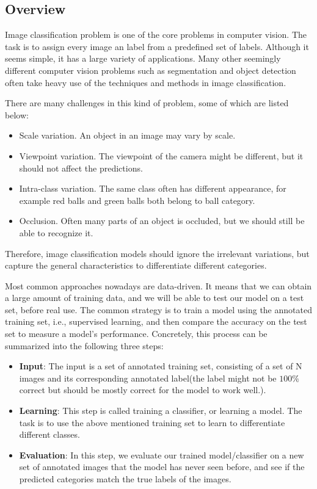 \subsection{Overview}
Image classification problem is one of the core problems in computer vision. The task is to assign every image an label from a predefined set of labels. Although it seems simple, it has a large variety of applications. Many other seemingly different computer vision problems such as segmentation and object detection often take heavy use of the techniques and methods in image classification. 

There are many challenges in this kind of problem, some of which are listed below:
\begin{itemize}
	\item Scale variation. An object in an image may vary by scale.
	\item Viewpoint variation. The viewpoint of the camera might be different, but it should not affect the predictions.
	\item Intra-class variation. The same class often has different appearance, for example red balls and green balls both belong to ball category.
	\item Occlusion. Often many parts of an object is occluded, but we should still be able to recognize it.
\end{itemize}
Therefore, image classification models should ignore the irrelevant variations, but capture the general characteristics to differentiate different categories.

Most common approaches nowadays are data-driven. It means that we can obtain a large amount of training data, and we will be able to test our model on a test set, before real use. The common strategy is to train a model using the annotated training set, i.e., supervised learning, and then compare the accuracy on the test set to measure a model's performance. Concretely, this process can be summarized into the following three steps:
\begin{itemize}
	\item \textbf{Input}: The input is a set of annotated training set, consisting of a set of N images and its corresponding annotated label(the label might not be $100\%$ correct but should be mostly correct for the model to work well.).
	\item \textbf{Learning}: This step is called training a classifier, or learning a model. The task is to use the above mentioned training set to learn to differentiate different classes.
	\item \textbf{Evaluation}: In this step, we evaluate our trained model/classifier on a new set of annotated images that the model has never seen before, and see if the predicted categories match the true labels of the images. 
\end{itemize}

